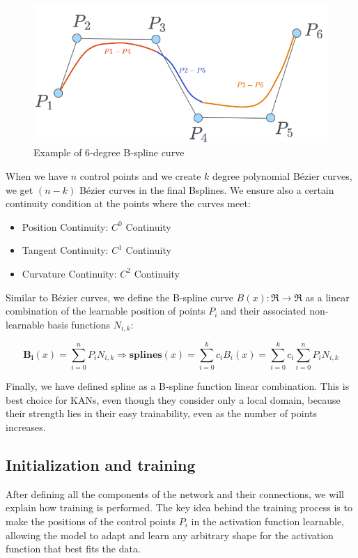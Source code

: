 \documentclass[12pt,a4paper]{article}
\begin{document}
\begin{figure}[H]
    \centering
    \includegraphics[width=0.5\linewidth]{Images/bezier4.png}
    \caption{Example of 6-degree B-spline curve}
    \label{fig:bezier4}
\end{figure}

When we have $n$ control points and we create $k$ degree polynomial Bézier curves, we get $(n-k)$ Bézier curves in the final Bsplines. We ensure also a certain continuity condition at the points where the curves meet:
\begin{itemize}
    \item Position Continuity: $C^0$ Continuity 
    \item Tangent Continuity: $C^1$ Continuity  
    \item Curvature Continuity: $C^2$ Continuity 
\end{itemize}

Similar to Bézier curves, we define the B-spline curve \( B(x): \Re \to \Re \) as a linear combination of the learnable position of points \( P_i \) and their associated non-learnable basis functions \( N_{i,k} \):


\[
\mathbf{B_i}(x) = \sum_{i=0}^n P_i N_{i,k} \Rightarrow \textbf{splines}(x ) = \sum_{i=0}^k c_i B_{i}(x) = \sum_{i=0}^k c_i \sum_{i=0}^n P_i N_{i,k}
\]

Finally, we have defined spline as a B-spline function linear combination. This is best choice for KANs, even though they consider only a local domain, because their strength lies in their easy trainability, even as the number of points increases.


\subsection{Initialization and training}
After defining all the components of the network and their connections, we will explain how training is performed. The key idea behind the training process is to make the positions of the control points $P_i$ in the activation function learnable, allowing the model to adapt and learn any arbitrary shape for the activation function that best fits the data. \cite{KAN,kan_intro}
\end{document}
